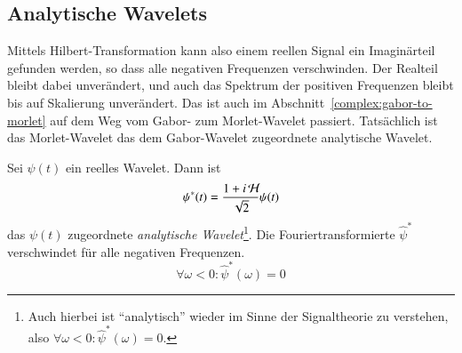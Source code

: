 \subsection{Analytische Wavelets}

Mittels Hilbert-Transformation kann also einem reellen Signal ein Imaginärteil gefunden werden, so dass alle negativen Frequenzen verschwinden.
Der Realteil bleibt dabei unverändert, und auch das Spektrum der positiven Frequenzen bleibt bis auf Skalierung unverändert.
Das ist auch im Abschnitt~\ref{complex:gabor-to-morlet} auf dem Weg vom Gabor- zum Morlet-Wavelet passiert.
Tatsächlich ist das Morlet-Wavelet das dem Gabor-Wavelet zugeordnete analytische Wavelet.

\begin{satz}
	\label{complex:analytic-wavelet}
	Sei $\psi(t)$ ein reelles Wavelet. Dann ist
	\begin{equation}
		\psi^\ast(t) = \frac{1+i\Hilb}{\sqrt{2}}\psi(t)
	\end{equation}
	das $\psi(t)$ zugeordnete \emph{analytische Wavelet}\footnote{Auch hierbei ist ``analytisch'' wieder im Sinne der Signaltheorie zu verstehen, also $\forall \omega < 0 \colon \hat\psi^\ast(\omega) = 0$.}.
	Die Fouriertransformierte $\hat\psi^\ast$ verschwindet für alle negativen Frequenzen.
	\[\forall \omega < 0 \colon \hat\psi^\ast(\omega) = 0\]
\end{satz}

